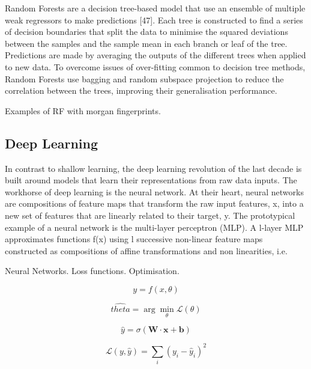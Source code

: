 Random Forests are a decision tree-based model that use an ensemble of multiple weak regressors to make predictions [47]. Each tree is constructed to find a series of decision boundaries that split the data to minimise the squared deviations between the samples and the sample mean in each branch or leaf of the tree. Predictions are made by averaging the outputs of the different trees when applied to new data. To overcome issues of over-fitting common to decision tree methods, Random Forests use bagging and random subspace projection to reduce the correlation between the trees, improving their generalisation performance.

Examples of RF with morgan fingerprints.
\subsection{Deep Learning}

In contrast to shallow learning, the deep learning revolution of the last decade is built around models that learn their representations from raw data inputs. The workhorse of deep learning is the neural network. At their heart, neural networks are compositions of feature maps that transform the raw input features, x, into a new set of features that are linearly related to their target, y. The prototypical example of a neural network is the multi-layer perceptron (MLP). A l-layer MLP approximates functions f(x) using l successive non-linear feature maps constructed as compositions of affine transformations and non linearities, i.e.

Neural Networks. Loss functions. Optimisation.

\begin{equation}
    y = f(x, \theta)
\end{equation}

\begin{equation}
    \hat{theta} = \arg\min_{\theta} \mathcal{L}(\theta)
\end{equation}

\begin{equation}
    \hat{y} = \sigma(\mathbf{W} \cdot \mathbf{x} + \mathbf{b})
\end{equation}

\begin{equation}
    \mathcal{L}(y, \hat{y}) = \sum_{i}(y_i - \hat{y}_i)^{2}
\end{equation}

